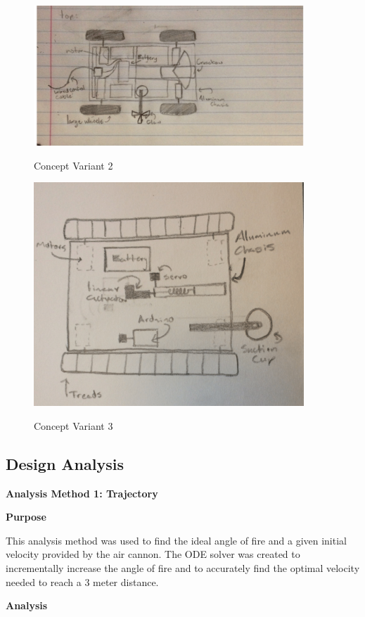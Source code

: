 \documentclass[12pt,letterpaper,titlepage]{article}
\begin{document}
\begin{figure}[H]
	\centering
	\includegraphics[width=4in]{images/CV2}
	\label{fig:CV2}
	\caption{Concept Variant 2}
\end{figure}

\begin{figure}[H]
	\centering
	\includegraphics[width=4in]{images/CV3}
	\label{fig:CV3}
	\caption{Concept Variant 3}
\end{figure}




\subsection{Design Analysis}
\smallskip\noindent\textbf{Analysis Method 1: Trajectory}

\medskip\noindent\textbf{Purpose}

This analysis method was used to find the ideal angle of fire and a given initial velocity provided by the air cannon. The ODE solver was created to incrementally increase the angle of fire and to accurately find the optimal velocity needed to reach a 3 meter distance. 

\medskip\noindent\textbf{Analysis}
\end{document}
